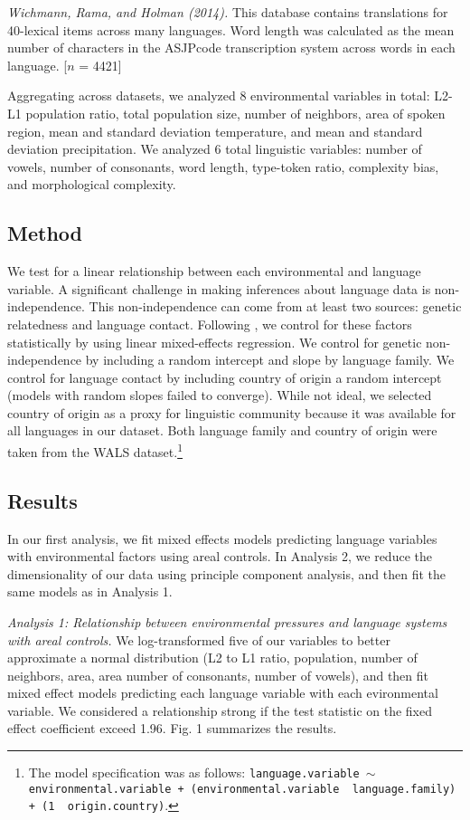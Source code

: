 \documentclass[10pt,letterpaper]{article}
\begin{document}
{\it Wichmann, Rama, and Holman (2014).} This database contains translations for 40-lexical items across many languages. Word length was calculated as the mean number of characters in the ASJPcode transcription system across words in each language. [$n$ = 4421]

Aggregating across datasets, we analyzed 8 environmental variables in total: L2-L1 population ratio, total population size, number of neighbors, area of spoken region, mean and standard deviation temperature, and mean and standard deviation precipitation. We analyzed 6 total linguistic variables: number of vowels, number of consonants, word length, type-token ratio, complexity bias, and morphological complexity.

\subsection{Method}
We test for a linear relationship between each environmental and language variable.  A significant challenge in making inferences about language data is non-independence. This non-independence can come from at least two sources: genetic relatedness and language contact. Following , we control for these factors statistically by using linear mixed-effects regression. We control for genetic non-independence by including a random intercept and slope by language family. We control for language contact by including country of origin a random intercept (models with random slopes failed to converge). While not ideal, we selected country of origin as a proxy for linguistic community because it  was available for all languages in our dataset. Both language family and country of origin were taken from the WALS dataset.\footnote{The model specification was as follows:  \texttt{language.variable $\sim$ environmental.variable + (environmental.variable~\textbar~language.family) +  (1~\textbar~origin.country)}.} 


\subsection{Results}
In our first analysis, we fit mixed effects models predicting language variables with environmental factors using areal controls. In Analysis 2, we reduce the dimensionality of our data using principle component analysis, and then fit the same models as in Analysis 1.

{\it Analysis 1: Relationship between environmental pressures and language systems with areal controls.}
We  log-transformed five of our variables to better approximate a normal distribution (L2 to L1 ratio, population,  number of neighbors, area, area number of consonants, number of vowels), and then fit mixed effect models predicting each language variable with each evironmental variable. We considered a relationship strong if the test statistic on the fixed effect coefficient exceed 1.96. Fig. 1 summarizes the results.
\end{document}
